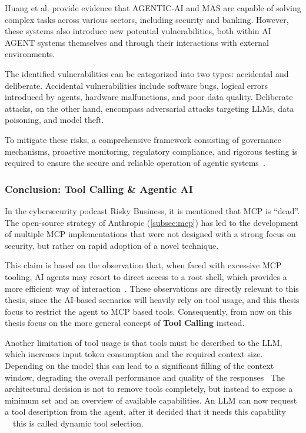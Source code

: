 Huang et al. provide evidence that \gls{AGENTIC-AI} and \gls{MAS} are capable of solving complex tasks across various sectors, including security and banking.
However, these systems also introduce new potential vulnerabilities, both within \gls{AI AGENT} systems themselves and through their interactions with external environments.

The identified vulnerabilities can be categorized into two types: accidental and deliberate.
Accidental vulnerabilities include software bugs, logical errors introduced by agents, hardware malfunctions, and poor data quality.
Deliberate attacks, on the other hand, encompass adversarial attacks targeting \gls{LLM}s, data poisoning, and model theft.

To mitigate these risks, a comprehensive framework consisting of governance mechanisms,
proactive monitoring, regulatory compliance, and rigorous testing is required to ensure the secure and reliable operation of agentic systems~\cite{chapter12}.

\subsubsection{Conclusion: Tool Calling \& Agentic \gls{AI}}\label{subsubsec:mcp-is-dead}

In the cybersecurity podcast Risky Business, it is mentioned that \gls{MCP} is \enquote{dead}.
The open-source strategy of \gls{Anthropic} (\ref{subsec:mcp}) has led to the development of multiple \gls{MCP} implementations that were not designed with a strong focus on security,
but rather on rapid adoption of a novel technique.

This claim is based on the observation that, when faced with excessive \gls{MCP} tooling, \gls{AI} agents may resort to direct access to a root shell, which provides a more efficient way of interaction~\cite{riskybiz_mcp}.
These observations are directly relevant to this thesis,
since the \gls{AI}-based scenarios will heavily rely on tool usage,
and this thesis focus to restrict the agent to \gls{MCP} based tools.
Consequently, from now on this thesis focus on the more general concept of \textbf{Tool Calling} instead.

Another limitation of tool usage is that tools must be described to the \gls{LLM}, which
increases input token consumption and the required context size.
Depending on the model this can lead to a significant filling of the context window,
degrading the overall performance and quality of the responses~\cite{langchain_context-engineering}
The architectural decision is not to remove tools completely,
but instead to expose a minimum set and an overview of available capabilities.
An \gls{LLM} can now request a tool description from the agent,
after it decided that it needs this capability
~\textthreequartersemdash~this is called dynamic tool selection.

